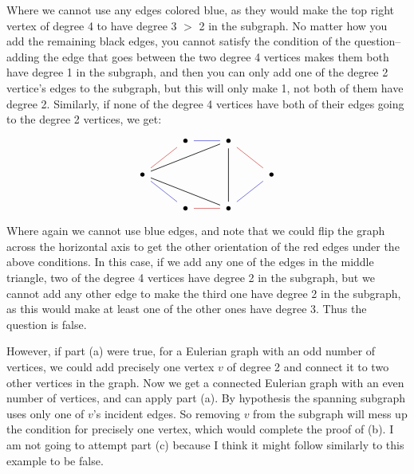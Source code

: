 \documentclass[12pt]{article}
\theoremstyle{definitionstyle}
\begin{document}
    Where we cannot use any edges colored blue, as they would make the top right vertex of degree 4 to have degree 3 $>$ 2 in the subgraph. No matter how you add the remaining black edges, you cannot satisfy the condition of the question--adding the edge that goes between the two degree 4 vertices makes them both have degree 1 in the subgraph, and then you can only add one of the degree 2 vertice's edges to the subgraph, but this will only make 1, not both of them have degree 2. Similarly, if none of the degree 4 vertices have both of their edges going to the degree 2 vertices, we get:
    \[\begin{tikzcd}
        & \bullet & \bullet \\
        \bullet &&& \bullet \\
        & \bullet & \bullet
        \arrow[color={rgb,255:red,92;green,92;blue,214}, no head, from=1-2, to=1-3]
        \arrow[no head, from=1-3, to=2-1]
        \arrow[color={rgb,255:red,214;green,92;blue,92}, no head, from=1-3, to=2-4]
        \arrow[no head, from=1-3, to=3-3]
        \arrow[color={rgb,255:red,214;green,92;blue,92}, no head, from=2-1, to=1-2]
        \arrow[no head, from=2-1, to=3-3]
        \arrow[color={rgb,255:red,92;green,92;blue,214}, no head, from=2-4, to=3-3]
        \arrow[color={rgb,255:red,92;green,92;blue,214}, no head, from=3-2, to=2-1]
        \arrow[color={rgb,255:red,214;green,92;blue,92}, no head, from=3-3, to=3-2]
    \end{tikzcd}\]
    Where again we cannot use blue edges, and note that we could flip the graph across the horizontal axis to get the other orientation of the red edges under the above conditions. In this case, if we add any one of the edges in the middle triangle, two of the degree 4 vertices have degree 2 in the subgraph, but we cannot add any other edge to make the third one have degree 2 in the subgraph, as this would make at least one of the other ones have degree 3. Thus the question is false. 

    However, if part (a) were true, for a Eulerian graph with an odd number of vertices, we could add precisely one vertex $v$ of degree 2 and connect it to two other vertices in the graph. Now we get a connected Eulerian graph with an even number of vertices, and can apply part (a). By hypothesis the spanning subgraph uses only one of $v$'s incident edges. So removing $v$ from the subgraph will mess up the condition for precisely one vertex, which would complete the proof of (b). I am not going to attempt part (c) because I think it might follow similarly to this example to be false.  
\end{document}
